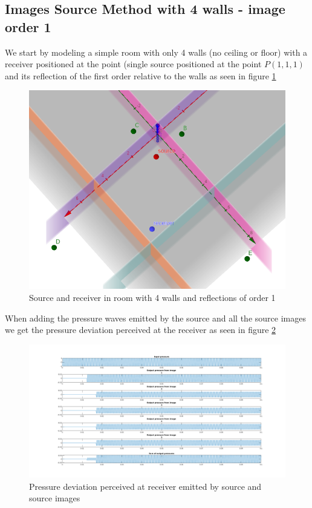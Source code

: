 \subsection{Images Source Method with 4 walls - image order 1}
We start by modeling a simple room with only 4 walls (no ceiling or floor) with a receiver positioned at the point (single source positioned at the point $P(1,1,1)$ and its reflection of the first order relative to the walls as seen in figure \ref{fig:ism_4_1_geo}\\
\begin{figure}
    \centerline{\includegraphics[width=1.3\textwidth,keepaspectratio]{LaTeX/images/geometrie/ism_4_walls_order_1.png}}
    \caption{Source and receiver in room with 4 walls and reflections of order 1}
    \label{fig:ism_4_1_geo}
\end{figure}
When adding the pressure waves emitted by the source and all the source images we get the pressure deviation perceived at the receiver as seen in figure \ref{fig:ism_4_1_mat}
\begin{figure}

    \centerline{\includegraphics[width=1.8\textwidth,keepaspectratio]{LaTeX/images/plots/matlab_4_walls_order_1.png}}
    \caption{Pressure deviation perceived at receiver emitted by source and source images}
    \label{fig:ism_4_1_mat}
\end{figure}
\newpage
